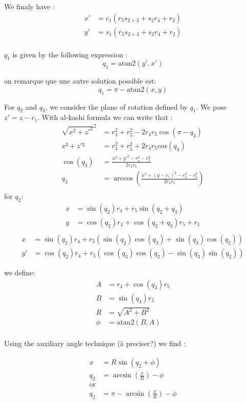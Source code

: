 \documentclass{article}
\begin{document}
We finaly have :
\begin{align*}
  x'&=c_1(r_5s_{2+3}+s_2r_4+r_2)\\
  y'&=s_1(r_5s_{2+3}+s_2r_4+r_2)\\
\end{align*}

$q_1$ is given by the following expression :
\[
q_1=\text{atan2}(y',x')
\]

on remarque que une autre solution possible est:
\[
q_1=\pi-\text{atan2}(x,y)
\]


For $q_2$ and $q_3$, we consider the plane of rotation defined by $q_1$.
We pose $z'=z-r_1$.
With al-kashi formula we can write that :
\begin{align*}
  \sqrt{x^2+z'^2}^2&=r_4^2+r_5^2-2r_4r_5\cos(\pi-q_3)\\
  x²+z'²&=r_4^2+r_5^2+2r_4r_5cos(q_3)\\
  \cos(q_3)&= \frac{x^2+y'^2-r_4^2-r_5^2}{2r_4r_5}\\
  q_3&=\arccos(\frac{x^2+(y-r_1)^2-r_4^2-r_5^2}{2r_4r_5})\\
\end{align*}
for $q_2$:
\begin{align*}
  x&=\sin(q_2)r_4+r_5\sin(q_2+q_3)\\
  y&=\cos(q_2)r_4+\cos(q_2+q_3)r_5 + r_1\\
\end{align*}
\begin{align*}
  x&=\sin(q_2)r_4+r_5(\sin(q_2)\cos(q_3)+\sin(q_3)\cos(q_2))\\
  y'&=\cos(q_2)r_4+r_5(\cos(q_3)\cos(q_2)-\sin(q_3)\sin(q_2))
\end{align*}

we define:
\begin{align*}
  A&= r_4+\cos(q_3)r_5\\
  B&= \sin(q_3)r_5 \\
  R&=\sqrt{A^2+B^2}\\
  \phi&=\text{atan2}(B,A)\\
\end{align*}

Using the auxiliary angle technique (à preciser?) we find :

\begin{align*}
  x&=R\sin(q_2+\phi)\\
  q_2&=\arcsin(\frac{x}{R})-\phi\\
  \text{or}\\
  q_2&=\pi-\arcsin(\frac{x}{R})-\phi\\
\end{align*}
\end{document}
